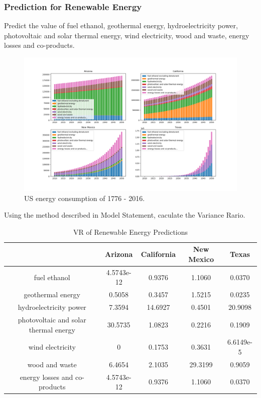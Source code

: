 \documentclass{mcmthesis}
\begin{document}
\subsubsection{Prediction for Renewable Energy}
	Predict the value of fuel ethanol, geothermal energy, hydroelectricity power, photovoltaic and solar thermal energy, wind electricity,  wood and waste, energy losses and co-products.
  \begin{figure}[!h]
    \centering
    \includegraphics[width=\textwidth]{figures//figure7.png}
    \caption{US energy consumption of 1776 - 2016.}
  \end{figure}
	Using the method described in Model Statement, caculate the Variance Rario.
			\begin{table}[!h]
  			\centering
  			\begin{tabular}{ccccc}
			\toprule  %
			& Arizona & California & New Mexico & Texas\\
			\midrule
			fuel ethanol &4.5743e-12 & 0.9376 & 1.1060 & 0.0370\\
			\midrule
			geothermal energy & 0.5058 & 0.3457 & 1.5215 & 0.0235\\
			\midrule
			 hydroelectricity power &7.3594 & 14.6927 & 0.4501 &  20.9098 \\
			 \midrule
			 photovoltaic and solar thermal energy & 30.5735 & 1.0823 & 0.2216 & 0.1909 \\
			 \midrule
			 wind electricity & 0 & 0.1753 & 0.3631 & 6.6149e-5 \\
			 \midrule
			 wood and waste & 6.4654 & 2.1035 & 29.3199 & 0.9059\\
			 \midrule
			 energy losses and co-products & 4.5743e-12 & 0.9376 &  1.1060 & 0.0370 \\
			\bottomrule %
			\end{tabular}
			\caption{VR of Renewable Energy Predictions}
			\end{table}\\
\end{document}
